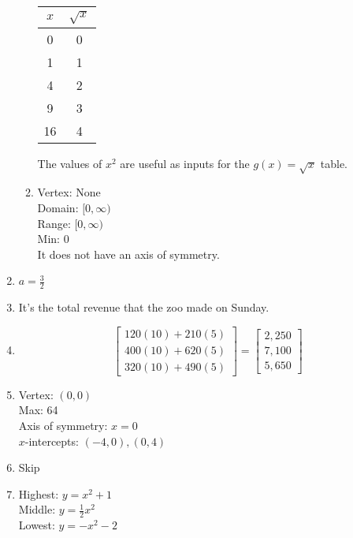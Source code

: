 \documentclass{article}
\begin{document}
\begin{enumerate}
\begin{enumerate}
		\begin{tabular}{c | c}
		$x$ & $\sqrt{x}$ \\
		\hline
		0 & 0 \\
		1 & 1 \\
		4 & 2 \\
		9 & 3 \\
		16 & 4
		\end{tabular}
	
		The values of $x^2$ are useful as inputs for the $g(x) = \sqrt{x}$ table.
	
	\item Vertex: None \\
		Domain: $[0, \infty)$ \\
		Range: $[0, \infty)$ \\
		Min: 0 \\
		It does not have an axis of symmetry.
	
	\end{enumerate}
	
\item $a = \frac{3}{2}$

\item It's the total revenue that the zoo made on Sunday.

\item 
	\begin{equation*}
	\begin{bmatrix}
	120(10) + 210(5) \\
	400(10) + 620(5) \\
	320(10) + 490(5)
	\end{bmatrix} =
	\begin{bmatrix}
	2,250 \\
	7,100 \\
	5,650
	\end{bmatrix}
	\end{equation*}
	
\item Vertex: $(0,0)$ \\
	Max: 64 \\
	Axis of symmetry: $x = 0$ \\
	$x$-intercepts: $(-4,0), (0,4)$ \\
	
\item Skip

\item Highest: $y = x^2 + 1$ \\
	Middle: $y = \frac{1}{2}x^2$ \\
	Lowest: $y = -x^2 - 2$
	

\end{enumerate}
\end{document}
